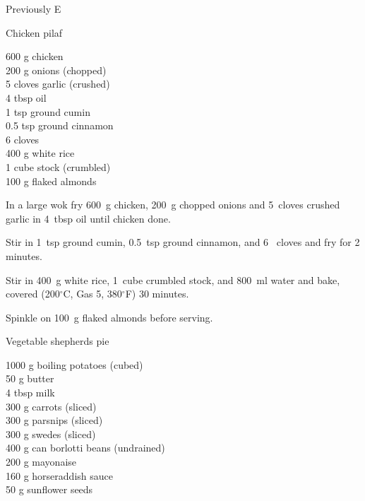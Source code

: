 \begin{menu}{Previously E}
    \begin{recipe}{2}{Chicken pilaf}%
    
		\begin{ingredients}
		600 g chicken  \\
	200 g onions (chopped) \\
	5 cloves garlic (crushed) \\
	4 tbsp oil  \\
	1 tsp ground cumin  \\
	0.5 tsp ground cinnamon  \\
	6  cloves  \\
	400 g white rice  \\
	1 cube stock (crumbled) \\
	100 g flaked almonds  \\
	
		\end{ingredients}
	
    \begin{instructions}
    \item 
        In a large wok fry
        600~g  chicken,
        200~g chopped onions
        and
        5~cloves crushed garlic
        in
        4~tbsp  oil
        until chicken done.
      \item 
        Stir in
        1~tsp  ground cumin,
        0.5~tsp  ground cinnamon,
        and
        6~  cloves
        and fry for 2 minutes.
      \item 
        Stir in
        400~g  white rice,
        1~cube crumbled stock,
        and
        800~ml  water
        and bake, covered 
      (200$^{\circ}$C, Gas 5, 380$^{\circ}$F)
     30 minutes.
      \item 
        Spinkle on
        100~g  flaked almonds
        before serving.
      
    \end{instructions}
    \end{recipe}%
  
    \begin{recipe}{2}{Vegetable shepherds pie}%
    
		\begin{ingredients}
		1000 g boiling potatoes (cubed) \\
	50 g butter  \\
	4 tbsp milk  \\
	300 g carrots (sliced) \\
	300 g parsnips (sliced) \\
	300 g swedes (sliced) \\
	400 g can borlotti beans (undrained) \\
	200 g mayonaise  \\
	160 g horseraddish sauce  \\
	50 g sunflower seeds  \\
	

\end{ingredients}
\end{recipe}
\end{menu}
